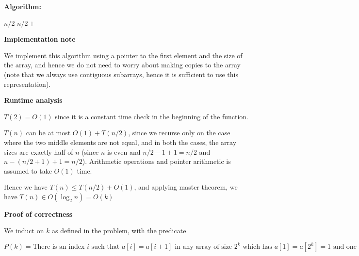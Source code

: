 \documentclass[answers]{exam}
\begin{document}
\begin{questions}

    \begin{solution}
        \textbf{Algorithm:}

        \begin{algorithmic}
                \State {}
            \EndIf
                \State \Return $n / 2$
            \EndIf
                \State \Return {}
            \Else
                \State \Return $n / 2 +$ 
            \EndIf
            \EndFunction
        \end{algorithmic}

        \textbf{Implementation note}

We implement this algorithm using a pointer to the first element and the size of the array, and hence we do not need to worry about making copies to the array (note that we always use contiguous subarrays, hence it is sufficient to use this representation).

        \textbf{Runtime analysis}

        $T(2) = O(1)$ since it is a constant time check in the beginning of the function.

        $T(n)$ can be at most $O(1) + T(n / 2)$, since we recurse only on the case where the two middle elements are not equal, and in both the cases, the array sizes are exactly half of $n$ (since
        $n$ is even and $n/2 - 1 + 1 = n/2$ and $n - (n/2 + 1) + 1 = n/2$). Arithmetic operations and pointer arithmetic is assumed to take $O(1)$ time.

        Hence we have $T(n) \le T(n / 2) + O(1)$, and applying master theorem, we have $T(n) \in O(\log_2 n) = O(k)$

\textbf{Proof of correctness}

We induct on $k$ as defined in the problem, with the predicate

$P(k) = \text{There is an index }i \text{ such that } a[i] = a[i + 1] \text{ in any array of size } 2^k \text{ which has } a[1] = a[2^k] = 1\text{ and one such occurrence is returned by the
        algorithm }solve\text{ when applied on the array } a$


\end{solution}
\end{questions}
\end{document}
